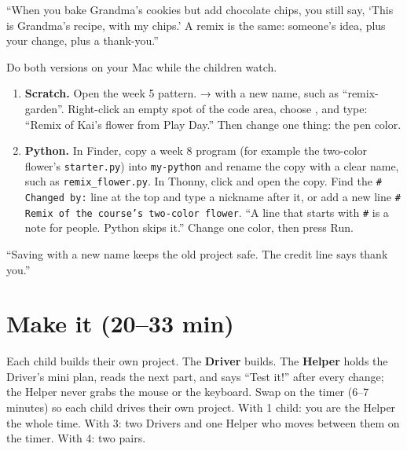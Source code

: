 \begin{analogy}
\enquote{When you bake Grandma's cookies but add chocolate chips, you still say, \enquote{This is Grandma's recipe, with my chips.} A remix is the same: someone's idea, plus your change, plus a thank-you.}
\end{analogy}

\begin{workedexample}
Do both versions on your Mac while the children watch.
\begin{enumerate}[leftmargin=1.4em,itemsep=1pt]
  \item \textbf{Scratch.} Open the week 5 pattern.  →  with a new name, such as \enquote{remix-garden}. Right-click an empty spot of the code area, choose , and type: \enquote{Remix of Kai's flower from Play Day.} Then change one thing: the pen color.
  \item \textbf{Python.} In Finder, copy a week 8 program (for example the two-color flower's \texttt{starter.py}) into \texttt{my-python} and rename the copy with a clear name, such as \texttt{remix\_flower.py}. In Thonny, click  and open the copy. Find the \texttt{\# Changed by:} line at the top and type a nickname after it, or add a new line \texttt{\# Remix of the course's two-color flower}. \enquote{A line that starts with \texttt{\#} is a note for people. Python skips it.} Change one color, then press Run.
\end{enumerate}
\enquote{Saving with a new name keeps the old project safe. The credit line says thank you.}
\end{workedexample}

\section{Make it (20--33 min)}
\begin{pairroles}
Each child builds their own project. The \textbf{Driver} builds. The \textbf{Helper} holds the Driver's mini plan, reads the next part, and says \enquote{Test it!} after every change; the Helper never grabs the mouse or the keyboard. Swap on the timer (6--7 minutes) so each child drives their own project. With 1 child: you are the Helper the whole time. With 3: two Drivers and one Helper who moves between them on the timer. With 4: two pairs.
\end{pairroles}

